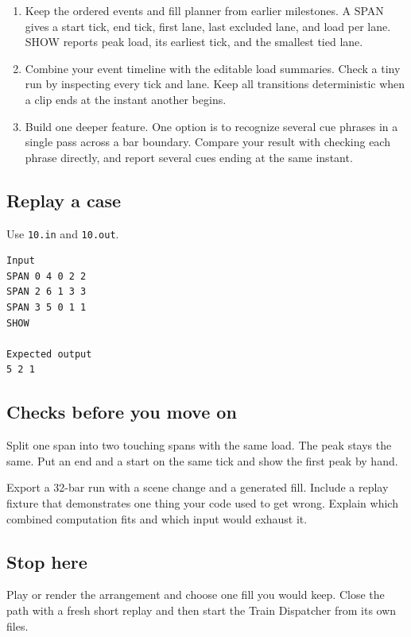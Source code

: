 \documentclass[11pt,letterpaper]{article}
\begin{document}
\begin{enumerate}
\item Keep the ordered events and fill planner from earlier milestones. A SPAN gives a start tick, end tick, first lane, last excluded lane, and load per lane. SHOW reports peak load, its earliest tick, and the smallest tied lane.
\item Combine your event timeline with the editable load summaries. Check a tiny run by inspecting every tick and lane. Keep all transitions deterministic when a clip ends at the instant another begins.
\item Build one deeper feature. One option is to recognize several cue phrases in a single pass across a bar boundary. Compare your result with checking each phrase directly, and report several cues ending at the same instant.
\end{enumerate}

\subsection*{Replay a case}

Use \texttt{10.in} and \texttt{10.out}.

\begin{samepage}
\small
\begin{verbatim}
Input
SPAN 0 4 0 2 2
SPAN 2 6 1 3 3
SPAN 3 5 0 1 1
SHOW

Expected output
5 2 1
\end{verbatim}
\end{samepage}

\subsection*{Checks before you move on}

Split one span into two touching spans with the same load. The peak stays the same. Put an end and a start on the same tick and show the first peak by hand.

Export a 32-bar run with a scene change and a generated fill. Include a replay fixture that demonstrates one thing your code used to get wrong. Explain which combined computation fits and which input would exhaust it.

\subsection*{Stop here}

Play or render the arrangement and choose one fill you would keep. Close the path with a fresh short replay and then start the Train Dispatcher from its own files.
\end{document}
